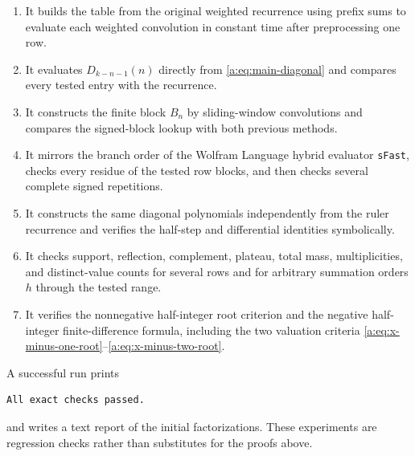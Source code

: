 \documentclass[11pt,a4paper,oneside,openany]{book}
\numberwithin{equation}{chapter}
\theoremstyle{definition}
\theoremstyle{remark}
\newcommand{\Diag}{D}
\begin{document}
\begin{enumerate}
\item It builds the table from the original weighted recurrence using prefix
sums to evaluate each weighted convolution in constant time after preprocessing
one row.

\item It evaluates \(\Diag_{k-n-1}(n)\) directly from
\eqref{a:eq:main-diagonal} and compares every tested entry with the recurrence.

\item It constructs the finite block \(B_n\) by sliding-window convolutions
and compares the signed-block lookup with both previous methods.

\item It mirrors the branch order of the Wolfram Language hybrid evaluator
\texttt{sFast}, checks every residue of the tested row blocks, and then checks
several complete signed repetitions.

\item It constructs the same diagonal polynomials independently from the
ruler recurrence and verifies the half-step and differential identities
symbolically.

\item It checks support, reflection, complement, plateau, total mass,
multiplicities, and distinct-value counts for several rows and for arbitrary
summation orders \(h\) through the tested range.

\item It verifies the nonnegative half-integer root criterion and the negative
half-integer finite-difference formula, including the two valuation criteria
\eqref{a:eq:x-minus-one-root}--\eqref{a:eq:x-minus-two-root}.
\end{enumerate}

A successful run prints
\begin{lstlisting}
All exact checks passed.
\end{lstlisting}
and writes a text report of the initial factorizations.  These experiments are
regression checks rather than substitutes for the proofs above.
\end{document}
